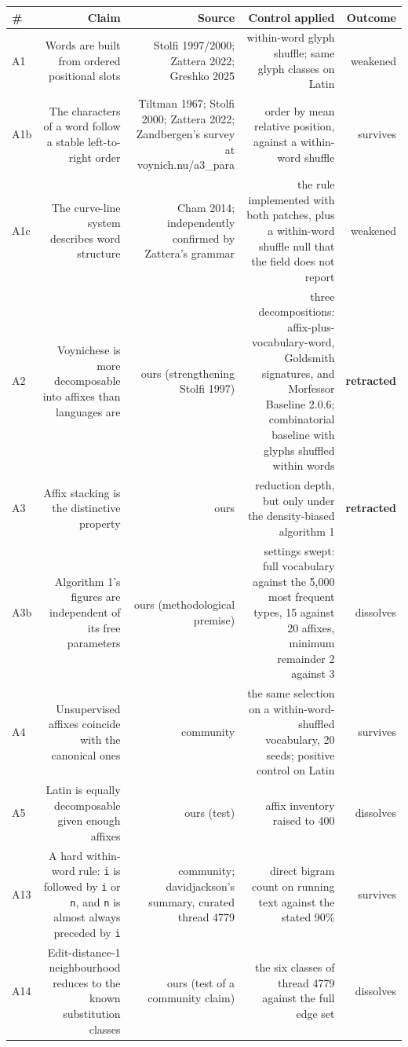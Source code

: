 \documentclass[11pt,a4paper]{article}
\begin{document}
\begin{table}[htbp]\centering\small
\begin{tabular}{@{}lrrrr@{}}
\toprule
\# & Claim & Source & Control applied & Outcome \\
\midrule
A1 & Words are built from ordered positional slots & Stolfi 1997/2000; Zattera 2022; Greshko 2025 & within-word glyph shuffle; same glyph classes on Latin & weakened \\
A1b & The characters of a word follow a stable left-to-right order & Tiltman 1967; Stolfi 2000; Zattera 2022; Zandbergen's survey at voynich.nu/a3\_para & order by mean relative position, against a within-word shuffle & survives \\
A1c & The curve-line system describes word structure & Cham 2014; independently confirmed by Zattera's grammar & the rule implemented with both patches, plus a within-word shuffle null that the field does not report & weakened \\
A2 & Voynichese is more decomposable into affixes than languages are & ours (strengthening Stolfi 1997) & three decompositions: affix-plus-vocabulary-word, Goldsmith signatures, and Morfessor Baseline 2.0.6; combinatorial baseline with glyphs shuffled within words & \textbf{retracted} \\
A3 & Affix stacking is the distinctive property & ours & reduction depth, but only under the density-biased algorithm 1 & \textbf{retracted} \\
A3b & Algorithm 1's figures are independent of its free parameters & ours (methodological premise) & settings swept: full vocabulary against the 5,000 most frequent types, 15 against 20 affixes, minimum remainder 2 against 3 & dissolves \\
A4 & Unsupervised affixes coincide with the canonical ones & community & the same selection on a within-word-shuffled vocabulary, 20 seeds; positive control on Latin & survives \\
A5 & Latin is equally decomposable given enough affixes & ours (test) & affix inventory raised to 400 & dissolves \\
A13 & A hard within-word rule: \texttt{i} is followed by \texttt{i} or \texttt{n}, and \texttt{n} is almost always preceded by \texttt{i} & community; davidjackson's summary, curated thread 4779 & direct bigram count on running text against the stated 90\% & survives \\
A14 & Edit-distance-1 neighbourhood reduces to the known substitution classes & ours (test of a community claim) & the six classes of thread 4779 against the full edge set & dissolves \\

\end{tabular}
\end{table}
\end{document}

